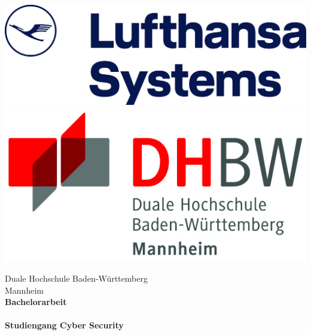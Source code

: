 \begin{titlepage}
    \begin{minipage}{\textwidth}
            \vspace{-2cm}
            \noindent
            \includegraphics[scale=0.035]{img/Uzletiforditas.hu-Lufthansa.png} 
             \hfill   
             \includegraphics{img/logo.jpg}
    \end{minipage}
    
    \vspace{2em}
    \sffamily
    \begin{center}
        \textsf{\large{}Duale Hochschule Baden-W\"urttemberg\\[1.5mm] Mannheim}\\[2em]
        \textsf{\textbf{\Large{}Bachelorarbeit}}\\[3mm]
        \vspace{5em}
        \textsf{\textbf{\Large{\DerTitelDerArbeit}}} \\[1.5cm]
        \vspace{5em}
        \textsf{\textbf{Studiengang Cyber Security}\\[3mm]}
        
        \vspace{3em}
    \vfill
    
    \begin{minipage}{\textwidth}
    

\end{minipage}
\end{center}
\end{titlepage}
